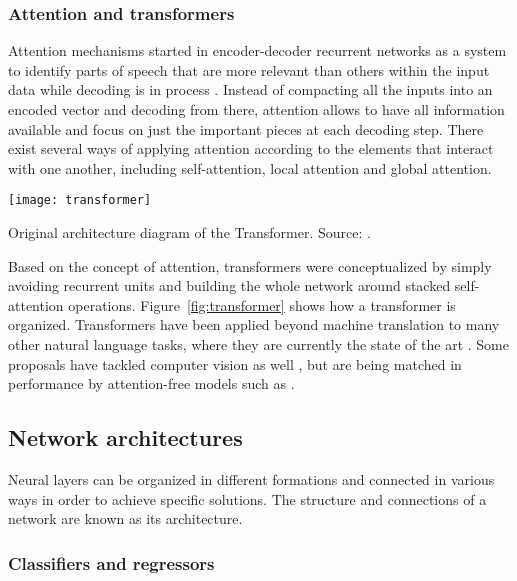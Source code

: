 \subsubsection{Attention and transformers}

Attention mechanisms started in encoder-decoder recurrent networks as a system to identify parts of speech that are more relevant than others within the input data while decoding is in process . Instead of compacting all the inputs into an encoded vector and decoding from there, attention allows to have all information available and focus on just the important pieces at each decoding step. There exist several ways of applying attention according to the elements that interact with one another, including self-attention, local attention and global attention.

\begin{marginfigure}
    \texttt{[image: transformer]}
    \caption{\label{fig:transformer}Original architecture diagram of the Transformer. Source: \cite{vaswani2017attention}.}
\end{marginfigure}

Based on the concept of attention, transformers  were conceptualized by simply avoiding recurrent units and building the whole network around stacked self-attention operations. Figure~\ref{fig:transformer} shows how a transformer is organized. 
Transformers have been applied beyond machine translation to many other natural language tasks, where they are currently the state of the art . Some proposals have tackled computer vision as well , but are being matched in performance by attention-free models such as .

\subsection{Network architectures}

Neural layers can be organized in different formations and connected in various ways in order to achieve specific solutions. The structure and connections of a network are known as its architecture.

\subsubsection{Classifiers and regressors}

